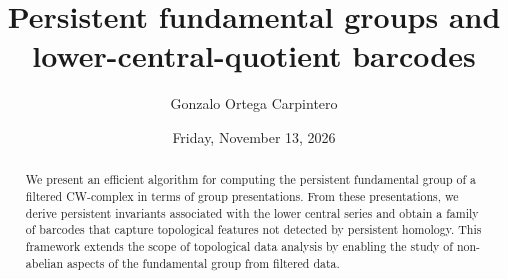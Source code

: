 \documentclass{UAmathtalk}
\author{Gonzalo Ortega Carpintero}
\title{Persistent fundamental groups and lower-central-quotient barcodes}
\date{Friday, November 13, 2026}
\begin{document}
\maketitle
\renewcommand*{\abstractsize}{\fontsize{13.5}{16.2}\selectfont}
\begin{abstract}
    {
        We present an efficient algorithm for computing the persistent fundamental group of a filtered CW-complex in terms of group presentations. From these presentations, we derive persistent invariants associated with the lower central series and obtain a family of barcodes that capture topological features not detected by persistent homology. This framework extends the scope of topological data analysis by enabling the study of non-abelian aspects of the fundamental group from filtered data.    }
\end{abstract}
\end{document}

